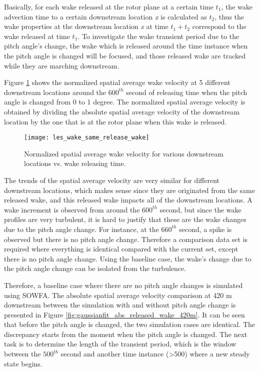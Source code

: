 \documentclass{umthesis}
\begin{document}
Basically, for each wake released at the rotor plane at a certain time $t_1$, the wake advection time to a certain downstream location \textit{x} is calculated as $t_2$, thus the wake properties at the downstream location \textit{x} at time $t_1 + t_2$ correspond to the wake released at time $t_1$. To investigate the wake transient period due to the pitch angle’s change, the wake which is released around the time instance when the pitch angle is changed will be focused, and those released wake are tracked while they are marching downstream.

Figure \ref{fig:les_wake_same_release_wake} shows the normalized spatial average wake velocity at 5 different downstream locations around the $600^{th}$ second of releasing time when the pitch angle is changed from 0 to 1 degree. The normalized spatial average velocity is obtained by dividing the absolute spatial average velocity of the downstream location by the one that is at the rotor plane when this wake is released. 

\begin{figure}
  \centering
  \texttt{[image: les\_wake\_same\_release\_wake]}
  \caption{Normalized spatial average wake velocity for various downstream locations vs. wake releasing time.}\label{fig:les_wake_same_release_wake}
\end{figure}

The trends of the spatial average velocity are very similar for different downstream locations, which makes sense since they are originated from the same released wake, and this released wake impacts all of the downstream locations. A wake increment is observed from around the $600^{th}$ second, but since the wake profiles are very turbulent, it is hard to justify that these are the wake changes due to the pitch angle change. For instance, at the $660^{th}$ second, a spike is observed but there is no pitch angle change. Therefore a comparison data set is required where everything is identical compared with the current set, except there is no pitch angle change. Using the baseline case, the wake's change due to the pitch angle change can be isolated from the turbulence.

Therefore, a baseline case where there are no pitch angle changes is simulated using SOWFA. The absolute spatial average velocity comparison at 420 m downstream between the simulation with and without pitch angle change is presented in Figure \ref{fig:gaussianfit_abs_released_wake_420m}. It can be seen that before the pitch angle is changed, the two simulation cases are identical. The discrepancy starts from the moment when the pitch angle is changed. The next task is to determine the length of the transient period, which is the window between the $500^{th}$ second and another time instance (\textgreater500) where a new steady state begins. 
\end{document}
